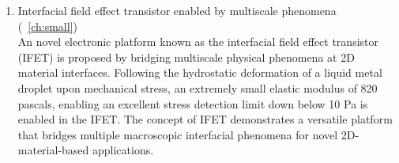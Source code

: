 \begin{enumerate}
\item Interfacial field effect transistor enabled by multiscale phenomena (~\autoref{ch:small})\\
  
  An novel electronic platform known as the interfacial field effect
  transistor (IFET) is proposed by bridging multiscale physical
  phenomena at 2D material interfaces. Following the hydrostatic
  deformation of a liquid metal droplet upon mechanical stress, an
  extremely small elastic modulus of 820 pascals, enabling an
  excellent stress detection limit down below 10 Pa is enabled in the
  IFET. The concept of IFET demonstrates a versatile platform that
  bridges multiple macroscopic interfacial phenomena for novel
  2D-material-based applications.
\end{enumerate}






